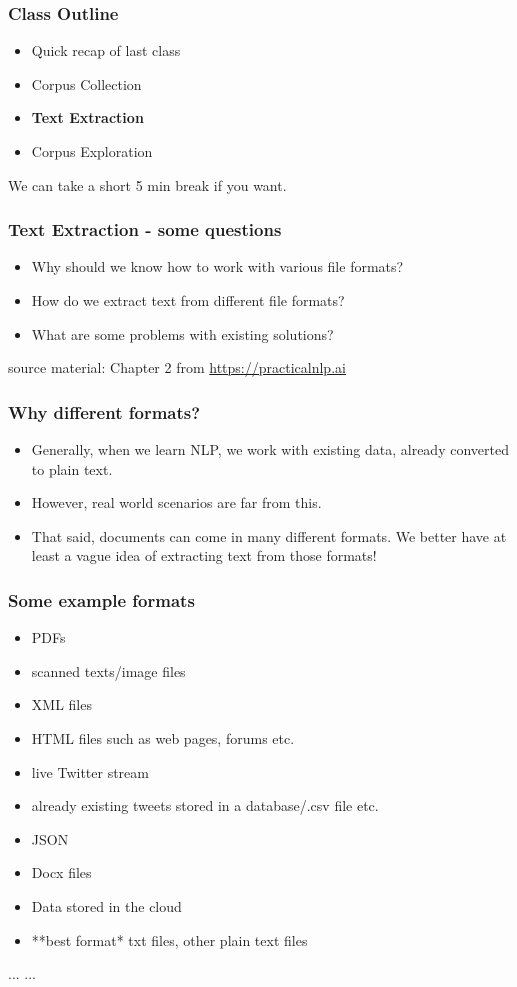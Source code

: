 \documentclass{beamer}
\begin{document}
\begin{frame}
\frametitle{Class Outline}
\begin{itemize}
    \item Quick recap of last class
    \item Corpus Collection
    \item \textbf{Text Extraction}
    \item Corpus Exploration
\end{itemize}
We can take a short 5 min break if you want. 
\end{frame}

\begin{frame}
\frametitle{Text Extraction - some questions}
\begin{itemize}
\item Why should we know how to work with various file formats?
\item How do we extract text from different file formats?
\item What are some problems with existing solutions?
\end{itemize}
source material: Chapter 2 from \url{https://practicalnlp.ai}
\end{frame}

\begin{frame}
\frametitle{Why different formats?}
\begin{itemize}
\item Generally, when we learn NLP, we work with existing data, already converted to plain text.
\item However, real world scenarios are far from this.
\item That said, documents can come in many different formats. We better have at least a vague idea of extracting text from those formats!
\end{itemize}
\end{frame}

\begin{frame}
\frametitle{Some example formats}
\begin{itemize}
\item PDFs
\item scanned texts/image files
\item XML files
\item HTML files such as web pages, forums etc. 
\item live Twitter stream
\item already existing tweets stored in a database/.csv file etc.
\item JSON
\item Docx files
\item Data stored in the cloud
\item **best format* txt files, other plain text files
\end{itemize}
... ...
\end{frame}
\end{document}
